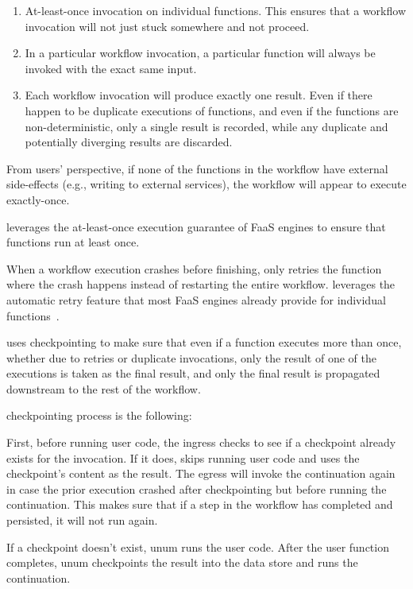 \begin{enumerate}

	\item At-least-once invocation on individual functions. This ensures that a
	workflow invocation will not just stuck somewhere and not proceed.

	\item In a particular workflow invocation, a particular function will
	always be invoked with the exact same input.

	\item Each workflow invocation will produce exactly one result. Even if
	there happen to be duplicate executions of functions, and even if the
	functions are non-deterministic, only a single result is recorded, while
	any duplicate and potentially diverging results are discarded.

\end{enumerate}

From users' perspective, if none of the functions in the workflow have
external side-effects (e.g., writing to external services), the workflow will
appear to execute exactly-once.

\name{} leverages the at-least-once execution guarantee of FaaS engines to
ensure that functions run at least once.

When a workflow execution crashes before finishing, \name{} only retries the
function where the crash happens instead of restarting the entire workflow.
\name{} leverages the automatic retry feature that most FaaS engines already provide
for individual functions~\cite{azure-functions-retry,
google-cloud-functions-retry, aws-lambda-async-invoke}.

\name{} uses checkpointing to make sure that even if a function executes more
than once, whether due to retries or duplicate invocations, only the result of
one of the executions is taken as the final result, and only the final result
is propagated downstream to the rest of the workflow.

\name{} checkpointing process is the following:

First, before running user code, the ingress checks to see if a checkpoint
already exists for the invocation. If it does, \name{} skips running user code
and uses the checkpoint's content as the result. The egress will invoke the
continuation again in case the prior execution crashed after checkpointing but
before running the continuation. This makes sure that if a step in the
workflow has completed and persisted, it will not run again.

If a checkpoint doesn't exist, unum runs the user code. After the user
function completes, unum checkpoints the result into the data store and runs
the continuation.
